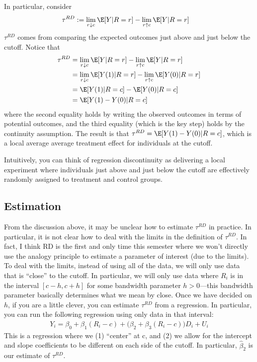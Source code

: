 \documentclass[
  letterpaper,
  DIV=11,
  numbers=noendperiod]{scrreprt}
\begin{document}
In particular, consider \begin{align*}
  \tau^{RD} := \lim_{r \downarrow c} \E[Y | R = r] &- \lim_{r \uparrow c} \E[Y | R = r]
\end{align*} \(\tau^{RD}\) comes from comparing the expected outcomes
just above and just below the cutoff. Notice that \begin{align*}
  \tau^{RD} &= \lim_{r \downarrow c} \E[Y | R = r] - \lim_{r \uparrow c} \E[Y | R = r] \\
  &= \lim_{r \downarrow c} \E[Y(1) | R = r] - \lim_{r \uparrow c} \E[Y(0) | R = r] \\
  &= \E[Y(1) | R = c] - \E[Y(0) | R = c] \\
  &= \E[Y(1) - Y(0) | R = c]
\end{align*} where the second equality holds by writing the observed
outcomes in terms of potential outcomes, and the third equality (which
is the key step) holds by the continuity assumption. The result is that
\(\tau^{RD} = \E[Y(1) - Y(0) | R = c]\), which is a local average
average treatment effect for individuals at the cutoff.

Intuitively, you can think of regression discontinuity as delivering a
local experiment where individuals just above and just below the cutoff
are effectively randomly assigned to treatment and control groups.

\subsection{Estimation}\label{estimation-1}

From the discussion above, it may be unclear how to estimate
\(\tau^{RD}\) in practice. In particular, it is not clear how to deal
with the limits in the definition of \(\tau^{RD}\). In fact, I think RD
is the first and only time this semester where we won't directly use the
analogy principle to estimate a parameter of interest (due to the
limits). To deal with the limits, instead of using all of the data, we
will only use data that is ``close'' to the cutoff. In particular, we
will only use data where \(R_i\) is in the interval \([c - h, c + h]\)
for some bandwidth parameter \(h > 0\)---this bandwidth parameter
basically determines what we mean by close. Once we have decided on
\(h\), if you are a little clever, you can estimate \(\tau^{RD}\) from a
regression. In particular, you can run the following regression using
only data in that interval: \begin{align*}
  Y_i = \beta_0 + \beta_1 (R_i-c) + \big(\beta_2 + \beta_3 (R_i-c)\big) D_i + U_i
\end{align*} This is a regression where we (1) ``center'' at c, and (2)
we allow for the intercept and slope coefficients to be different on
each side of the cutoff. In particular, \(\hat{\beta}_2\) is our
estimate of \(\tau^{RD}\).
\end{document}
